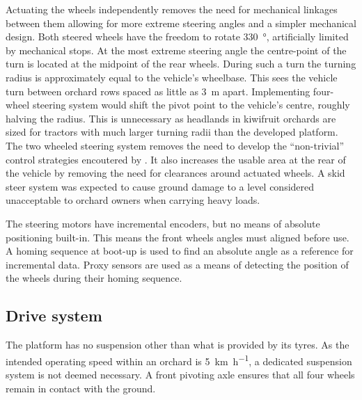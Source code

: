 \documentclass[preprint,authoryear,12pt]{elsarticle}
\begin{document}
        Actuating the wheels independently removes the need for mechanical linkages between them allowing for more extreme steering angles and a simpler mechanical design.
        Both steered wheels have the freedom to rotate \SI{330}{\degree}, artificially limited by mechanical stops.
        At the most extreme steering angle the centre-point of the turn is located at the midpoint of the rear wheels.
        During such a turn the turning radius is approximately equal to the vehicle's wheelbase.
        This sees the vehicle turn between orchard rows spaced as little as \SI{3}{\meter} apart.
        Implementing four-wheel steering system would shift the pivot point to the vehicle's centre, roughly halving the radius.
        This is unnecessary as headlands in kiwifruit orchards are sized for tractors with much larger turning radii than the developed platform.
        The two wheeled steering system removes the need to develop the ``non-trivial'' control strategies encoutered by \cite{Bak2004}.
        It also increases the usable area at the rear of the vehicle by removing the need for clearances around actuated wheels.
        A skid steer system was expected to cause ground damage to a level considered unacceptable to orchard owners when carrying heavy loads.

        The steering motors have incremental encoders, but no means of absolute positioning built-in.
        This means the front wheels angles must aligned before use.
        A homing sequence at boot-up is used to find an absolute angle as a reference for incremental data.
        Proxy sensors are used as a means of detecting the position of the wheels during their homing sequence.

    \subsection{Drive system}
    \label{sub:drive}

        The platform has no suspension other than what is provided by its tyres.
        As the intended operating speed within an orchard is \SI{5}{\kilo\meter\per\hour}, a dedicated suspension system is not deemed necessary.
        A front pivoting axle ensures that all four wheels remain in contact with the ground.
\end{document}
